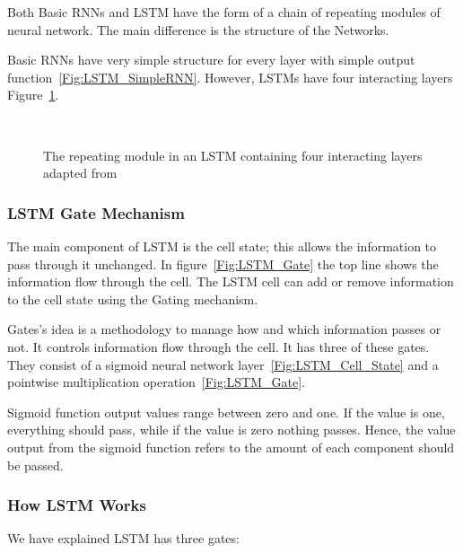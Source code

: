 Both Basic RNNs and LSTM have the form of a chain of repeating modules of neural network. The main difference is the structure of the Networks.%

Basic RNNs have very simple structure for every layer with simple output function~\ref{Fig:LSTM_SimpleRNN}. However, LSTMs have four interacting layers Figure~\ref{Fig:LSTM_Cell_Chaining}.
\begin{figure}[!ht]
	
	
	\endminipage\hfill
	
	\endminipage\hfill
	
	\endminipage
	\caption{The repeating module in an LSTM containing four interacting layers adapted from~\cite{colah}}~\label{Fig:LSTM_Cell_Chaining}
\end{figure}%

\subsubsection{LSTM Gate Mechanism}

The main component of LSTM is the cell state; this allows the information to pass through it unchanged. In figure~\ref{Fig:LSTM_Gate} the top line shows the information flow through the cell. The LSTM cell can add or remove information to the cell state using the Gating mechanism. 

Gates's idea is a methodology to manage how and which information passes or not. It controls information flow through the cell. It has three of these gates. They consist of a sigmoid neural network layer~\ref{Fig:LSTM_Cell_State} and a pointwise multiplication operation~\ref{Fig:LSTM_Gate}.

Sigmoid function output values range between zero and one. If the value is one, everything should pass, while if the value is zero nothing passes. Hence, the value output from the sigmoid function refers to the amount of each component should be passed.%

\subsubsection{How LSTM Works}

We have explained LSTM has three gates:

